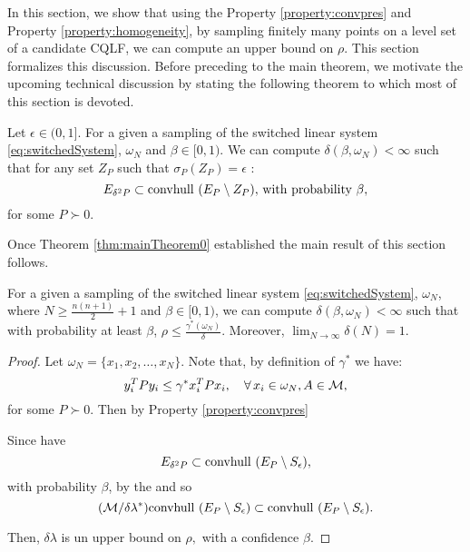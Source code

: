 In this section, we show that using the Property \ref{property:convpres} and Property \ref{property:homogeneity}, by sampling finitely many points on a level set of a candidate CQLF, we can compute an upper bound on $\rho$. This section formalizes this discussion. Before preceding to the main theorem, we motivate the upcoming technical discussion by stating the following theorem to which most of this section is devoted.

\begin{theorem} \label{thm:mainTheorem0} Let $\epsilon \in (0,1]$. For a given a sampling of the switched linear system \eqref{eq:switchedSystem}, $\omega_N$ and $\beta \in [0,1)$. We can compute $\delta(\beta, \omega_N) < \infty$ such that for any set $Z_P$ such that $\sigma_P(Z_P) = \epsilon$ :
\begin{equation}E_{\delta^2P} \subset  \mbox{convhull } (E_P \setminus Z_P),\, \text{with probability $\beta$},
\end{equation}
for some $P \succ 0$.
\end{theorem}
Once Theorem \ref{thm:mainTheorem0} established the main result of this section follows.
\begin{theorem} \label{thm:mainTheorem} For a given a sampling of the switched linear system \eqref{eq:switchedSystem}, $\omega_N$, where $N \geq \frac{n(n+1)}{2}+1$ and $\beta \in [0,1)$, we can compute $\delta(\beta, \omega_N) < \infty$ such that with probability at least $\beta$, $\rho \leq \frac{\gamma^*(\omega_N)}{\delta}$. Moreover, $\lim_{N \to \infty} \delta(N) = 1$.
\end{theorem}
\begin{proof}Let $\omega_N = \{x_1, x_2, \ldots, x_N\}$. Note that, by definition of $\gamma^*$ we have:
\begin{equation*} y_i^TPy_i \leq \gamma^* x_i^TPx_i, \quad \forall\, x_i \in \omega_N, A \in \mathcal{M},\end{equation*}
for some $P \succ 0$. Then by Property \ref{property:convpres}

Since have
$$ E_{\delta^2P} \subset  \mbox{convhull } (E_P\setminus S_\epsilon),$$ with probability $\beta$, by the and so
$$
(\mathcal{M}/\delta \lambda^*) \mbox{convhull } (E_P \setminus S_\epsilon) \subset \mbox{convhull } (E_P\setminus S_\epsilon).$$

Then, $\delta\lambda$ is un upper bound on $\rho,$ with a confidence $\beta.$ 
\end{proof}